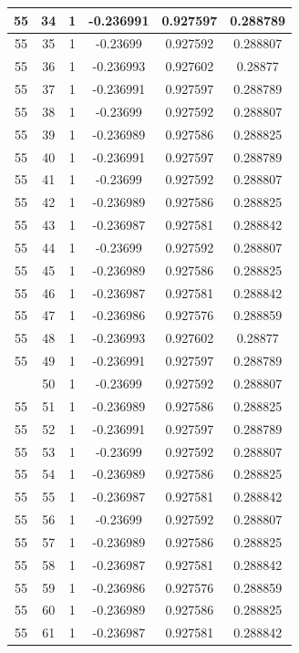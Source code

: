 \documentclass[12pt,a4paper]{article}
\numberwithin{equation}{section}
\numberwithin{figure}{section}
\numberwithin{table}{section}
\begin{document}
\begin{longtable}{|c|c|c|c|c|c|}
55 & 34 & 1 & -0.236991 & 0.927597 & 0.288789 \\ \hline
55 & 35 & 1 & -0.23699 & 0.927592 & 0.288807 \\ \hline
55 & 36 & 1 & -0.236993 & 0.927602 & 0.28877 \\ \hline
55 & 37 & 1 & -0.236991 & 0.927597 & 0.288789 \\ \hline
55 & 38 & 1 & -0.23699 & 0.927592 & 0.288807 \\ \hline
55 & 39 & 1 & -0.236989 & 0.927586 & 0.288825 \\ \hline
55 & 40 & 1 & -0.236991 & 0.927597 & 0.288789 \\ \hline
55 & 41 & 1 & -0.23699 & 0.927592 & 0.288807 \\ \hline
55 & 42 & 1 & -0.236989 & 0.927586 & 0.288825 \\ \hline
55 & 43 & 1 & -0.236987 & 0.927581 & 0.288842 \\ \hline
55 & 44 & 1 & -0.23699 & 0.927592 & 0.288807 \\ \hline
55 & 45 & 1 & -0.236989 & 0.927586 & 0.288825 \\ \hline
55 & 46 & 1 & -0.236987 & 0.927581 & 0.288842 \\ \hline
55 & 47 & 1 & -0.236986 & 0.927576 & 0.288859 \\ \hline
55 & 48 & 1 & -0.236993 & 0.927602 & 0.28877 \\ \hline
55 & 49 & 1 & -0.236991 & 0.927597 & 0.288789 \\ \hline
\pagebreak
55 & 50 & 1 & -0.23699 & 0.927592 & 0.288807 \\ \hline
55 & 51 & 1 & -0.236989 & 0.927586 & 0.288825 \\ \hline
55 & 52 & 1 & -0.236991 & 0.927597 & 0.288789 \\ \hline
55 & 53 & 1 & -0.23699 & 0.927592 & 0.288807 \\ \hline
55 & 54 & 1 & -0.236989 & 0.927586 & 0.288825 \\ \hline
55 & 55 & 1 & -0.236987 & 0.927581 & 0.288842 \\ \hline
55 & 56 & 1 & -0.23699 & 0.927592 & 0.288807 \\ \hline
55 & 57 & 1 & -0.236989 & 0.927586 & 0.288825 \\ \hline
55 & 58 & 1 & -0.236987 & 0.927581 & 0.288842 \\ \hline
55 & 59 & 1 & -0.236986 & 0.927576 & 0.288859 \\ \hline
55 & 60 & 1 & -0.236989 & 0.927586 & 0.288825 \\ \hline
55 & 61 & 1 & -0.236987 & 0.927581 & 0.288842 \\ \hline

\end{longtable}
\end{document}
